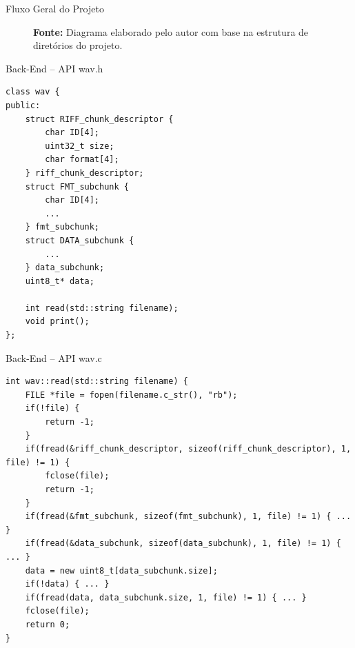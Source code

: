 \documentclass{beamer}
\begin{document}
\begin{frame}{Fluxo Geral do Projeto}
\centering
\begin{figure}
\vspace{0.5em}

{\small \textbf{Fonte:} Diagrama elaborado pelo autor com base na estrutura de diretórios do projeto.}
\end{figure}
\end{frame}

\begin{frame}[fragile]{Back-End -- API wav.h}
    \begin{lstlisting}[style=CStyle]
class wav {
public:
    struct RIFF_chunk_descriptor {
        char ID[4];
        uint32_t size;
        char format[4];
    } riff_chunk_descriptor;
    struct FMT_subchunk {
        char ID[4];
        ...
    } fmt_subchunk;
    struct DATA_subchunk {
        ...
    } data_subchunk;
    uint8_t* data; 

    int read(std::string filename);
    void print();
};
    \end{lstlisting}
\end{frame}

\begin{frame}[fragile]{Back-End -- API wav.c}
    \begin{lstlisting}[style=CStyle]
int wav::read(std::string filename) {
    FILE *file = fopen(filename.c_str(), "rb");
    if(!file) {
        return -1;
    }
    if(fread(&riff_chunk_descriptor, sizeof(riff_chunk_descriptor), 1, file) != 1) {
        fclose(file);
        return -1;
    }
    if(fread(&fmt_subchunk, sizeof(fmt_subchunk), 1, file) != 1) { ... }
    if(fread(&data_subchunk, sizeof(data_subchunk), 1, file) != 1) { ... }
    data = new uint8_t[data_subchunk.size];
    if(!data) { ... }
    if(fread(data, data_subchunk.size, 1, file) != 1) { ... }
    fclose(file);
    return 0;
}
    \end{lstlisting}
\end{frame}
\end{document}
